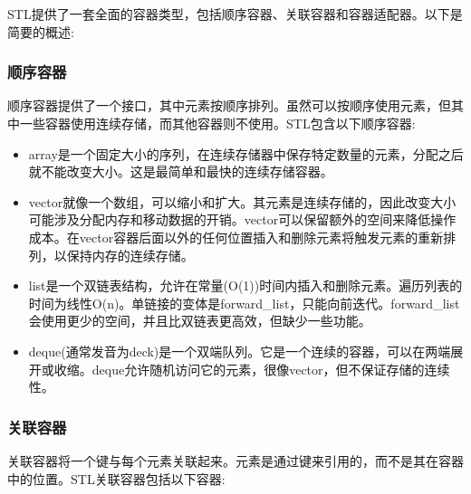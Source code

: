 
STL提供了一套全面的容器类型，包括顺序容器、关联容器和容器适配器。以下是简要的概述:

\subsubsection{顺序容器}

顺序容器提供了一个接口，其中元素按顺序排列。虽然可以按顺序使用元素，但其中一些容器使用连续存储，而其他容器则不使用。STL包含以下顺序容器:

\begin{itemize}
\item 
array是一个固定大小的序列，在连续存储器中保存特定数量的元素，分配之后就不能改变大小。这是最简单和最快的连续存储容器。

\item 
vector就像一个数组，可以缩小和扩大。其元素是连续存储的，因此改变大小可能涉及分配内存和移动数据的开销。vector可以保留额外的空间来降低操作成本。在vector容器后面以外的任何位置插入和删除元素将触发元素的重新排列，以保持内存的连续存储。

\item 
list是一个双链表结构，允许在常量(O(1))时间内插入和删除元素。遍历列表的时间为线性O(n)。单链接的变体是forward\_list，只能向前迭代。forward\_list会使用更少的空间，并且比双链表更高效，但缺少一些功能。

\item 
deque(通常发音为deck)是一个双端队列。它是一个连续的容器，可以在两端展开或收缩。deque允许随机访问它的元素，很像vector，但不保证存储的连续性。
\end{itemize}

\subsubsection{关联容器}

关联容器将一个键与每个元素关联起来。元素是通过键来引用的，而不是其在容器中的位置。STL关联容器包括以下容器:

